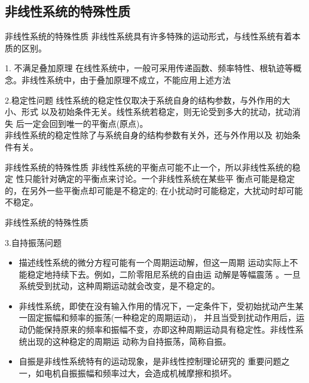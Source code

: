\documentclass[handout,cjkutf8,table,aspectratio=1610]{beamer} %
\begin{document}
\subsection{非线性系统的特殊性质}
\begin{frame}{非线性系统的特殊性质}
	非线性系统具有许多特殊的运动形式，与线性系统有着本质的区别。
	\begin{block}{1. 不满足叠加原理}
		在线性系统中，一般可采用传递函数、频率特性、根轨迹等概 念。非线性系统中，由于叠加原理不成立，不能应用上述方法
	\end{block}
	\begin{block}{2.稳定性问题}
		线性系统的稳定性仅取决于系统自身的结构参数，与外作用的大小、形式 以及初始条件无关。线性系统若稳定，则无论受到多大的扰动，扰动消失 后一定会回到唯一的平衡点(原点)。\\
非线性系统的稳定性除了与系统自身的结构参数有关外，还与外作用以及 初始条件有关。
	\end{block}
\end{frame}

\begin{frame}{非线性系统的特殊性质}
	非线性系统的平衡点可能不止一个，所以非线性系统的稳定 性只能针对确定的平衡点来讨论。一个非线性系统在某些平 衡点可能是稳定的，在另外一些平衡点却可能是不稳定的; 在小扰动时可能稳定，大扰动时却可能不稳定。
\end{frame}

\begin{frame}{非线性系统的特殊性质}
	\begin{block}{3.自持振荡问题}
		\begin{itemize}
			\item 描述线性系统的微分方程可能有一个周期运动解，但这一周期 运动实际上不能稳定地持续下去。例如，二阶零阻尼系统的自由运 动解是等幅震荡 。一旦系统受到扰动，这种周期运动就会改变，是不稳定的。\\
			\item 非线性系统，即使在没有输入作用的情况下，一定条件下，受初始扰动产生某一固定振幅和频率的振荡(一种稳定的周期运动)， 并且当受到扰动作用后，运动仍能保持原来的频率和振幅不变，亦即这种周期运动具有稳定性。非线性系统出现的这种稳定的周期运 动称为自持振荡，简称自振。\\
			\item 自振是非线性系统特有的运动现象，是非线性控制理论研究的 重要问题之一，如电机自振振幅和频率过大，会造成机械摩擦和损坏。
		\end{itemize}
	\end{block}
\end{frame}
\end{document}
